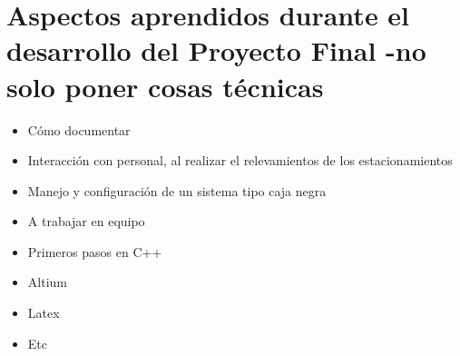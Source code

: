 \section{Aspectos aprendidos durante el desarrollo del Proyecto Final -no solo poner cosas técnicas}
\begin{itemize}
	\item Cómo documentar
	\item Interacción con personal, al realizar el relevamientos de los estacionamientos
	\item Manejo y configuración de un sistema tipo caja negra
	\item A trabajar en equipo
	\item Primeros pasos en C++
	\item Altium
	\item Latex
	\item Etc
\end{itemize}








